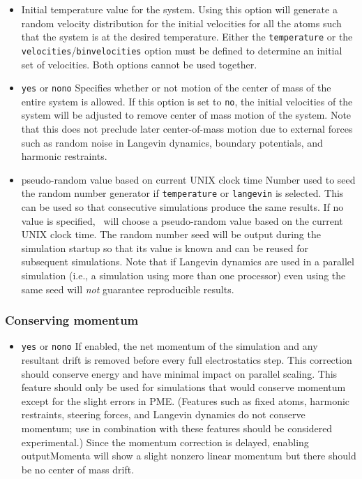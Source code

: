 \begin{itemize}
\item
{}
{\label{param:temperature}
Initial temperature value for the system.  
Using this option will generate a random
velocity distribution for the initial velocities 
for all the atoms such that the system 
is at the desired temperature.  
Either the {\tt temperature} 
or the {\tt velocities}/{\tt binvelocities}
option must be defined to determine an initial set of velocities.  
Both options cannot be used together.}

\item
{}
{{\tt yes} or {\tt no}}{{\tt no}}
{
Specifies whether or not motion of 
the center of mass of the entire system is allowed.  
If this option is set to {\tt no}, the initial velocities of the system 
will be adjusted to remove center of mass motion of the system.
Note that this does not preclude later center-of-mass motion due to 
external forces such as random noise in Langevin dynamics, boundary
potentials, and harmonic restraints.}

\item
{}
{pseudo-random value based on current UNIX clock time}
{Number used to seed the random number generator 
if {\tt temperature} or {\tt langevin} is selected.  This can be
used so that consecutive simulations produce the same results.
If no value is specified, \NAMD\ will choose a pseudo-random
value based on the current UNIX clock time.  The random number
seed will be output during the simulation startup so that
its value is known and can be reused for subsequent simulations.
Note that if Langevin dynamics are used in a parallel simulation 
(i.e., a simulation using more than one processor) 
even using the same seed will {\it not} guarantee reproducible results.
}

\end{itemize}


\subsubsection{Conserving momentum}

\begin{itemize}
\item
{}
{{\tt yes} or {\tt no}}{{\tt no}}
{
If enabled, the net momentum of the simulation and any resultant drift
is removed before every full electrostatics step.
This correction should conserve energy and have minimal impact on
parallel scaling.
This feature should only be used for simulations that would
conserve momentum except for the slight errors in PME.
(Features such as fixed atoms, harmonic restraints, steering forces,
and Langevin dynamics do not conserve momentum; use in combination
with these features should be considered experimental.)
Since the momentum correction is delayed, enabling outputMomenta 
will show a slight nonzero linear momentum but there should be no
center of mass drift.
}
\end{itemize}


